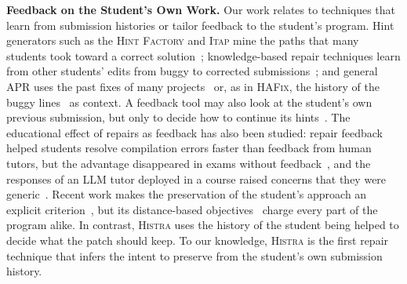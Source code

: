 \documentclass[10pt,conference]{IEEEtran}
\begin{document}
\textbf{Feedback on the Student's Own Work.} Our work relates to techniques that learn from submission histories or tailor feedback to the student's program. Hint generators such as the \textsc{Hint Factory} and \textsc{Itap} mine the paths that many students took toward a correct solution~\cite{barnes2008toward, paassen2017continuous, rivers2017data}; knowledge-based repair techniques learn from other students' edits from buggy to corrected submissions~\cite{rolim2017learning, zhang2024pydex, liu2024fastfixer, dai2026learner}; and general APR uses the past fixes of many projects~\cite{le2016history} or, as in \textsc{HAFix}, the history of the buggy lines~\cite{shi2026hafix} as context. A feedback tool may also look at the student's own previous submission, but only to decide how to continue its hints~\cite{paiva2025incremental}. The educational effect of repairs as feedback has also been studied: repair feedback helped students resolve compilation errors faster than feedback from human tutors, but the advantage disappeared in exams without feedback~\cite{ahmed2020characterizing}, and the responses of an LLM tutor deployed in a course raised concerns that they were generic~\cite{frankford2024ai}. Recent work makes the preservation of the student's approach an explicit criterion~\cite{koutcheme2023evaluating, koutcheme2025direct, pitts2026automated}, but its distance-based objectives~\cite{d2016qlose, koutcheme2025direct, dai2025less} charge every part of the program alike. In contrast, \textsc{Histra} uses the history of the student being helped to decide what the patch should keep. To our knowledge, \textsc{Histra} is the first repair technique that infers the intent to preserve from the student's own submission history.
\end{document}
